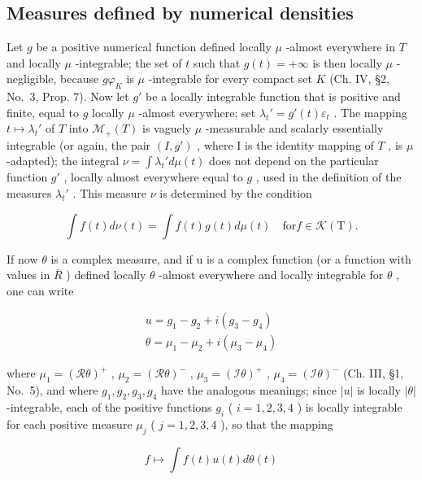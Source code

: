 \subsection{Measures defined by numerical densities}

Let \(g\) be a positive numerical function defined locally \(\mu\) -almost everywhere in \(T\) and locally \(\mu\) -integrable; the set of \(t\) such that \(g(t) = +\infty\) is then locally \(\mu\) -negligible, because \(g\varphi_{K}\) is \(\mu\) -integrable for every compact set \(K\) (Ch. IV, §2, No.~3, Prop. 7). Now let \(g'\) be a locally integrable function that is positive and finite, equal to \(g\) locally \(\mu\) -almost everywhere; set \(\lambda_t' = g'(t)\varepsilon_t\) . The mapping \(t \mapsto \lambda_t'\) of \(T\) into \(\mathcal{M}_+(T)\) is vaguely \(\mu\) -measurable and scalarly essentially integrable (or again, the pair \((I,g')\) , where I is the identity mapping of \(T\) , is \(\mu\) -adapted); the integral \(\nu = \int \lambda_t' d\mu(t)\) does not depend on the particular function \(g'\) , locally almost everywhere equal to \(g\) , used in the definition of the measures \(\lambda_t'\) . This measure \(\nu\) is determined by the condition

\[
\int f (t) d \nu (t) = \int f (t) g (t) d \mu (t) \quad \mathrm{for} f \in \mathcal {K} (\mathrm{T}).\tag{1}
\]

If now \(\theta\) is a complex measure, and if u is a complex function (or a function with values in \(\overline{R}\) ) defined locally \(\theta\) -almost everywhere and locally integrable for \(\theta\) , one can write

\[
\begin{array}{l} {u = g _ {1} - g _ {2} + i (g _ {3} - g _ {4})} \\ {\theta = \mu_ {1} - \mu_ {2} + i (\mu_ {3} - \mu_ {4})} \end{array}\tag{2}
\]

where \(\mu_{1} = (\mathcal{R}\theta)^{+}\) , \(\mu_{2} = (\mathcal{R}\theta)^{-}\) , \(\mu_{3} = (\mathcal{I}\theta)^{+}\) , \(\mu_{4} = (\mathcal{I}\theta)^{-}\) (Ch. III, §1, No.~5), and where \(g_{1}, g_{2}, g_{3}, g_{4}\) have the analogous meanings; since \(|u|\) is locally \(|\theta|\) -integrable, each of the positive functions \(g_{i}\) ( \(i = 1, 2, 3, 4\) ) is locally integrable for each positive measure \(\mu_{j}\) ( \(j = 1, 2, 3, 4\) ), so that the mapping

\[
f \mapsto \int f (t) u (t) d \theta (t)
\]

